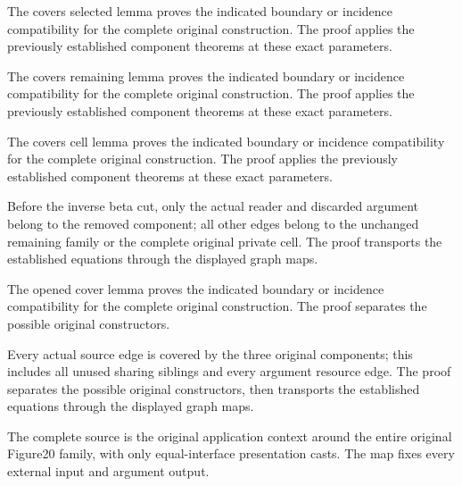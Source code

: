 The covers selected lemma proves the indicated boundary or incidence compatibility for the complete original construction.
The proof applies the previously established component theorems at these exact parameters.
\par{}

The covers remaining lemma proves the indicated boundary or incidence compatibility for the complete original construction.
The proof applies the previously established component theorems at these exact parameters.
\par{}

The covers cell lemma proves the indicated boundary or incidence compatibility for the complete original construction.
The proof applies the previously established component theorems at these exact parameters.
\par{}

Before the inverse beta cut, only the actual reader and discarded
argument belong to the removed component; all other edges belong to the
unchanged remaining family or the complete original private cell.
The proof transports the established equations through the displayed graph maps.
\par{}

The opened cover lemma proves the indicated boundary or incidence compatibility for the complete original construction.
The proof separates the possible original constructors.
\par{}

Every actual source edge is covered by the three original components;
this includes all unused sharing siblings and every argument resource edge.
The proof separates the possible original constructors, then transports the established equations through the displayed graph maps.
\par{}

The complete source is the original application context around the
entire original Figure20 family, with only equal-interface presentation casts.
The map fixes every external input and argument output.
\par{}

